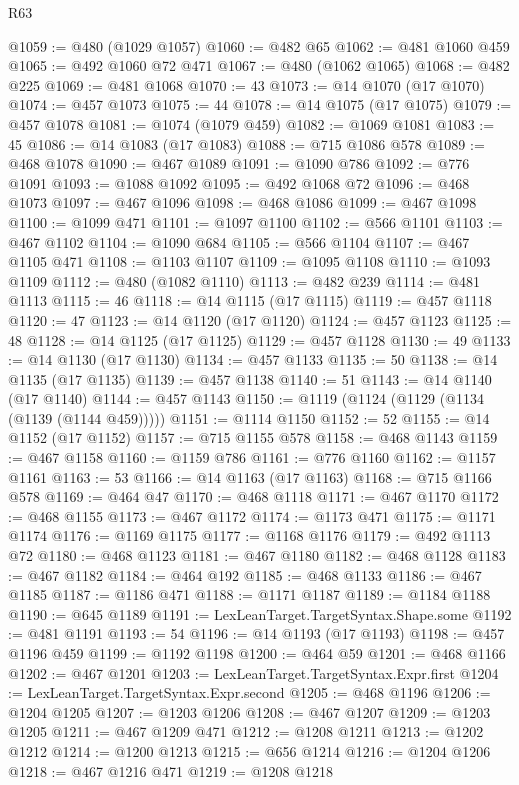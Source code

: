 \begin{lexlean}{R63}
\begin{coremodule}
@1059 := @480 (@1029 @1057)
@1060 := @482 @65
@1062 := @481 @1060 @459
@1065 := @492 @1060 @72 @471
@1067 := @480 (@1062 @1065)
@1068 := @482 @225
@1069 := @481 @1068
@1070 := 43
@1073 := @14 @1070 (@17 @1070)
@1074 := @457 @1073
@1075 := 44
@1078 := @14 @1075 (@17 @1075)
@1079 := @457 @1078
@1081 := @1074 (@1079 @459)
@1082 := @1069 @1081
@1083 := 45
@1086 := @14 @1083 (@17 @1083)
@1088 := @715 @1086 @578
@1089 := @468 @1078
@1090 := @467 @1089
@1091 := @1090 @786
@1092 := @776 @1091
@1093 := @1088 @1092
@1095 := @492 @1068 @72
@1096 := @468 @1073
@1097 := @467 @1096
@1098 := @468 @1086
@1099 := @467 @1098
@1100 := @1099 @471
@1101 := @1097 @1100
@1102 := @566 @1101
@1103 := @467 @1102
@1104 := @1090 @684
@1105 := @566 @1104
@1107 := @467 @1105 @471
@1108 := @1103 @1107
@1109 := @1095 @1108
@1110 := @1093 @1109
@1112 := @480 (@1082 @1110)
@1113 := @482 @239
@1114 := @481 @1113
@1115 := 46
@1118 := @14 @1115 (@17 @1115)
@1119 := @457 @1118
@1120 := 47
@1123 := @14 @1120 (@17 @1120)
@1124 := @457 @1123
@1125 := 48
@1128 := @14 @1125 (@17 @1125)
@1129 := @457 @1128
@1130 := 49
@1133 := @14 @1130 (@17 @1130)
@1134 := @457 @1133
@1135 := 50
@1138 := @14 @1135 (@17 @1135)
@1139 := @457 @1138
@1140 := 51
@1143 := @14 @1140 (@17 @1140)
@1144 := @457 @1143
@1150 := @1119 (@1124 (@1129 (@1134 (@1139 (@1144 @459)))))
@1151 := @1114 @1150
@1152 := 52
@1155 := @14 @1152 (@17 @1152)
@1157 := @715 @1155 @578
@1158 := @468 @1143
@1159 := @467 @1158
@1160 := @1159 @786
@1161 := @776 @1160
@1162 := @1157 @1161
@1163 := 53
@1166 := @14 @1163 (@17 @1163)
@1168 := @715 @1166 @578
@1169 := @464 @47
@1170 := @468 @1118
@1171 := @467 @1170
@1172 := @468 @1155
@1173 := @467 @1172
@1174 := @1173 @471
@1175 := @1171 @1174
@1176 := @1169 @1175
@1177 := @1168 @1176
@1179 := @492 @1113 @72
@1180 := @468 @1123
@1181 := @467 @1180
@1182 := @468 @1128
@1183 := @467 @1182
@1184 := @464 @192
@1185 := @468 @1133
@1186 := @467 @1185
@1187 := @1186 @471
@1188 := @1171 @1187
@1189 := @1184 @1188
@1190 := @645 @1189
@1191 := LexLeanTarget.TargetSyntax.Shape.some
@1192 := @481 @1191
@1193 := 54
@1196 := @14 @1193 (@17 @1193)
@1198 := @457 @1196 @459
@1199 := @1192 @1198
@1200 := @464 @59
@1201 := @468 @1166
@1202 := @467 @1201
@1203 := LexLeanTarget.TargetSyntax.Expr.first
@1204 := LexLeanTarget.TargetSyntax.Expr.second
@1205 := @468 @1196
@1206 := @1204 @1205
@1207 := @1203 @1206
@1208 := @467 @1207
@1209 := @1203 @1205
@1211 := @467 @1209 @471
@1212 := @1208 @1211
@1213 := @1202 @1212
@1214 := @1200 @1213
@1215 := @656 @1214
@1216 := @1204 @1206
@1218 := @467 @1216 @471
@1219 := @1208 @1218

\end{coremodule}
\end{lexlean}
